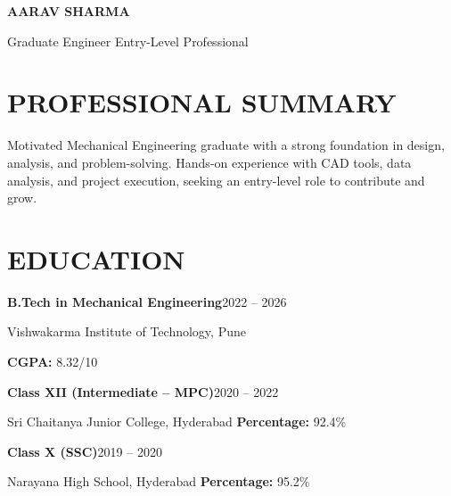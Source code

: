 \documentclass[10pt]{article}
\newcommand{\entry}[2]{\textbf{#1}\hfill #2\par}
\begin{document}
\fontsize{10.5}{13.2}\selectfont

{\color{navy}\fontsize{32}{36}\selectfont\bfseries AARAV SHARMA}\par\vspace{3pt}
{\fontsize{14}{17}\selectfont Graduate Engineer \textbar{} Entry-Level Professional}\par\vspace{4pt}
{\fontsize{8.8}{11}\selectfont
[+91 98765 43210] \enspace\textbar{} \enspace\textbar{}
\enspace\textbar{} \enspace\textbar{}}\par
\vspace{5pt}{\color{navy}\rule{\linewidth}{1.8pt}}\par

\section{PROFESSIONAL SUMMARY}
Motivated Mechanical Engineering graduate with a strong foundation in design, analysis, and problem-solving.
Hands-on experience with CAD tools, data analysis, and project execution, seeking an entry-level role to contribute and grow.

\section{EDUCATION}
\entry{B.Tech in Mechanical Engineering}{2022 -- 2026}
Vishwakarma Institute of Technology, Pune\par
\textbf{CGPA:} 8.32/10\par\vspace{5pt}

\entry{Class XII (Intermediate -- MPC)}{2020 -- 2022}
Sri Chaitanya Junior College, Hyderabad \enspace\textbar\enspace \textbf{Percentage:} 92.4\%\par\vspace{5pt}

\entry{Class X (SSC)}{2019 -- 2020}
Narayana High School, Hyderabad \enspace\textbar\enspace \textbf{Percentage:} 95.2\%\par

\end{document}
